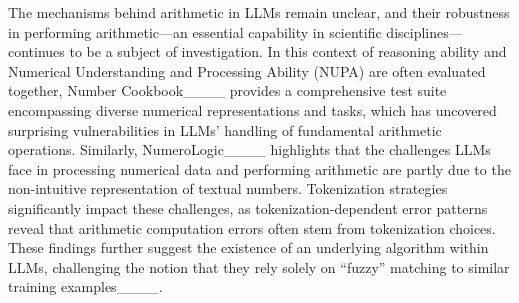 {The mechanisms behind arithmetic in LLMs remain unclear, and their robustness in performing arithmetic—an essential capability in scientific disciplines—continues to be a subject of investigation. In this context of reasoning ability and Numerical Understanding and Processing Ability (NUPA) are often evaluated together, Number Cookbook____ provides a comprehensive test suite encompassing diverse numerical representations and tasks, which has uncovered surprising vulnerabilities in LLMs' handling of fundamental arithmetic operations. Similarly, NumeroLogic____ highlights that the challenges LLMs face in processing numerical data and performing arithmetic are partly due to the non-intuitive representation of textual numbers. Tokenization strategies significantly impact these challenges, as tokenization-dependent error patterns reveal that arithmetic computation errors often stem from tokenization choices. These findings further suggest the existence of an underlying algorithm within LLMs, challenging the notion that they rely solely on “fuzzy” matching to similar training examples____.
}
\fi







\iffalse
\begin{itemize}
    \item The emergence of reasoning model: xxx
    \item CLIMATE Perdiction models
    \item CLIMAQA / ClimateGPT: Text definition benchmarj
    \item Reasoning model bench: AIME2024 (Math) Math Reasoning and GPQA(Science): A Graduate-Level Google-Proof Q\&A Benchmark
    \item Science + Numerical Value Variation: + Structural Variation: MM-PhyQA: Multimodal Physics Question-Answering  With Multi-Image CoT Prompting
    \item SCIBENCH: Evaluating College-Level Scientific Problem-Solving Abilities of  Large Language Models: that no single prompting strategy significantly outperforms the others and some strategies that demonstrate improvements in certain problem-solving skills could result in declines in other skills.
    \item: The Impact of Reasoning Step Length on Large Language Models: Reasoning step is important in Cot prompt
\end{itemize}
\fi